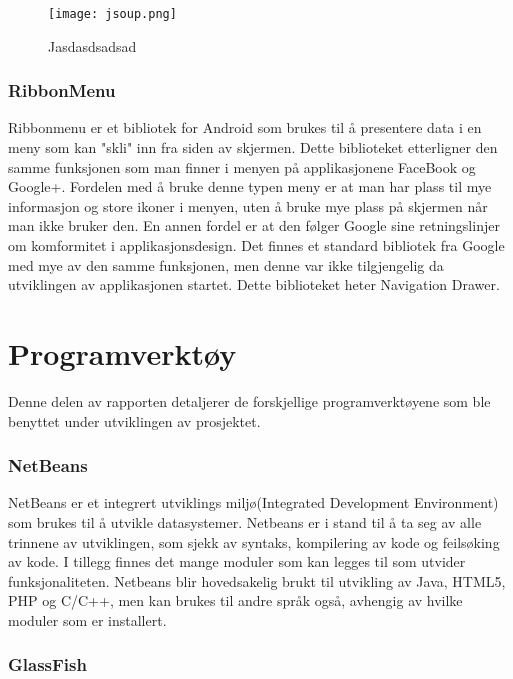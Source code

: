 \documentclass[../main.tex]{subfiles}
\begin{document}
\begin{figure}[h!]
  \centering
  \texttt{[image: jsoup.png]}
  \caption{Jasdasdsadsad}
\end{figure}

\subsubsection{RibbonMenu}

Ribbonmenu er et bibliotek for Android som brukes til å presentere data i en meny som kan "skli" inn fra siden av skjermen. Dette biblioteket etterligner den samme funksjonen som man finner i menyen på applikasjonene FaceBook og Google+. Fordelen med å bruke denne typen meny er at man har plass til mye informasjon og store ikoner i menyen, uten å bruke mye plass på skjermen når man ikke bruker den. En annen fordel er at den følger Google sine retningslinjer om komformitet i applikasjonsdesign. Det finnes et standard bibliotek fra Google med mye av den samme funksjonen, men denne var ikke tilgjengelig da utviklingen av applikasjonen startet. Dette biblioteket heter Navigation Drawer.

\section{Programverktøy}

Denne delen av rapporten detaljerer de forskjellige programverktøyene som ble benyttet under utviklingen av prosjektet.

\subsubsection{NetBeans}

NetBeans er et integrert utviklings miljø(Integrated Development Environment) som brukes til å utvikle datasystemer. Netbeans er i stand til å ta seg av alle trinnene av utviklingen, som sjekk av syntaks, kompilering av kode og feilsøking av kode. I tillegg finnes det mange moduler som kan legges til som utvider funksjonaliteten. Netbeans blir hovedsakelig brukt til utvikling av Java, HTML5, PHP og C/C++, men kan brukes til andre språk også, avhengig av hvilke moduler som er installert. 

\subsubsection{GlassFish}
\end{document}
